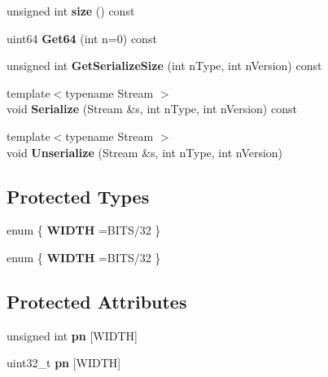 \begin{DoxyCompactItemize}
\mbox{\label{classbase__uint_a1f49b034e686269601ea89b0319b8004}} 
unsigned int {\bfseries size} () const
\item 
\mbox{\label{classbase__uint_adfeb2f147a433fae33c5fe29b2ed18fb}} 
uint64 {\bfseries Get64} (int n=0) const
\item 
\mbox{\label{classbase__uint_aa1830b40b57801f1e489adbf4c55ebd9}} 
unsigned int {\bfseries Get\+Serialize\+Size} (int n\+Type, int n\+Version) const
\item 
\mbox{\label{classbase__uint_a2f80cbf71c59275037810824dae9f0d0}} 
{\footnotesize template$<$typename Stream $>$ }\\void {\bfseries Serialize} (Stream \&s, int n\+Type, int n\+Version) const
\item 
\mbox{\label{classbase__uint_adf1ad639d94997a9cda95e0c424ab51a}} 
{\footnotesize template$<$typename Stream $>$ }\\void {\bfseries Unserialize} (Stream \&s, int n\+Type, int n\+Version)
\end{DoxyCompactItemize}
\subsection*{Protected Types}
\begin{DoxyCompactItemize}
\item 
\mbox{\label{classbase__uint_ad676a1f6abb92744b5796bbb4dee537e}} 
enum \{ {\bfseries W\+I\+D\+TH} =B\+I\+T\+S/32
 \}
\item 
\mbox{\label{classbase__uint_a3c2b29c18b858e5ac46ec51aef1f9ff4}} 
enum \{ {\bfseries W\+I\+D\+TH} =B\+I\+T\+S/32
 \}
\end{DoxyCompactItemize}
\subsection*{Protected Attributes}
\begin{DoxyCompactItemize}
\item 
\mbox{\label{classbase__uint_af84c551177d5de2f5cbce0fe0c2bab64}} 
unsigned int {\bfseries pn} \mbox{[}W\+I\+D\+TH\mbox{]}
\item 
\mbox{\label{classbase__uint_a0edb1465d540fadd92b21659f27083a2}} 
uint32\+\_\+t {\bfseries pn} \mbox{[}W\+I\+D\+TH\mbox{]}
\end{DoxyCompactItemize}
